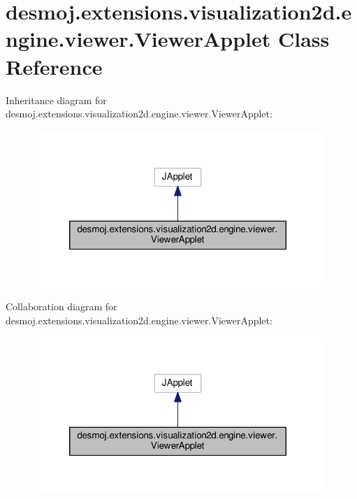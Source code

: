 \section{desmoj.\-extensions.\-visualization2d.\-engine.\-viewer.\-Viewer\-Applet Class Reference}
\label{classdesmoj_1_1extensions_1_1visualization2d_1_1engine_1_1viewer_1_1_viewer_applet}


Inheritance diagram for desmoj.\-extensions.\-visualization2d.\-engine.\-viewer.\-Viewer\-Applet\-:
\nopagebreak
\begin{figure}[H]
\begin{center}
\leavevmode
\includegraphics[width=310pt]{classdesmoj_1_1extensions_1_1visualization2d_1_1engine_1_1viewer_1_1_viewer_applet__inherit__graph}
\end{center}
\end{figure}


Collaboration diagram for desmoj.\-extensions.\-visualization2d.\-engine.\-viewer.\-Viewer\-Applet\-:
\nopagebreak
\begin{figure}[H]
\begin{center}
\leavevmode
\includegraphics[width=310pt]{classdesmoj_1_1extensions_1_1visualization2d_1_1engine_1_1viewer_1_1_viewer_applet__coll__graph}
\end{center}
\end{figure}
